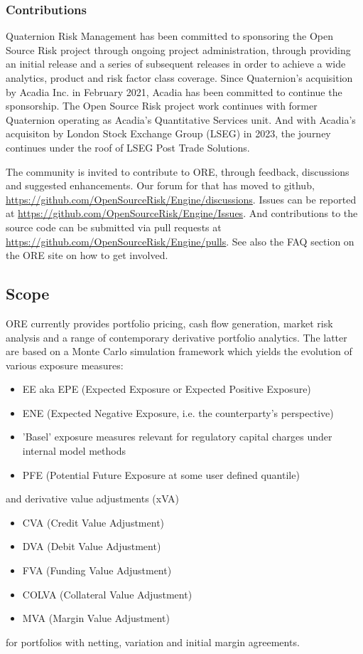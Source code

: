 \subsubsection*{Contributions}
Quaternion Risk Management \cite{QRM} has been committed to sponsoring the Open Source Risk project through ongoing project
administration, through providing an initial release and a series of subsequent releases in order to achieve a wide
analytics, product and risk factor class coverage. Since Quaternion's acquisition by Acadia Inc. in February 2021,
Acadia \cite{acadia} has been committed to continue the sponsorship. The Open Source Risk project work continues with
former Quaternion operating as Acadia's Quantitative Services unit. And with Acadia's acquisiton by London Stock
Exchange Group (LSEG) \cite{lseg} in 2023, the journey continues under the roof of LSEG Post Trade Solutions.

The community is invited to contribute to ORE, through feedback, discussions and suggested enhancements. Our forum 
for that has moved to github, \url{https://github.com/OpenSourceRisk/Engine/discussions}. Issues can be reported at
\url{https://github.com/OpenSourceRisk/Engine/Issues}. And contributions to the source code can be submitted via
pull requests at \url{https://github.com/OpenSourceRisk/Engine/pulls}.
See also the FAQ section on the ORE site \cite{ORE} on how to get involved.

\subsection{Scope}

ORE currently provides portfolio pricing, cash flow generation, market risk analysis and a range of contemporary derivative
portfolio analytics. The latter are based on a Monte Carlo simulation framework which yields the evolution of various exposure measures:
\begin{itemize}
\item EE aka EPE (Expected Exposure or Expected Positive Exposure)
\item ENE (Expected Negative Exposure, i.e. the counterparty's perspective)
\item 'Basel' exposure measures relevant for regulatory capital charges under internal model methods 
\item PFE (Potential Future Exposure at some user defined quantile)
\end{itemize}
and derivative value adjustments (xVA)
\begin{itemize}
\item CVA (Credit Value Adjustment)
\item DVA (Debit Value Adjustment)
\item FVA (Funding Value Adjustment)
\item COLVA (Collateral Value Adjustment)
\item MVA (Margin Value Adjustment)
\end{itemize}
for portfolios with netting, variation and initial margin agreements. 

